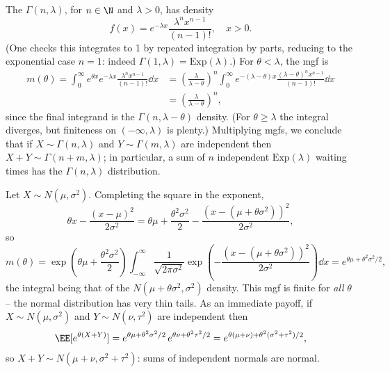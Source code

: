 \begin{example}
	The  $\Gamma(n, \lambda)$, for $n \in \N$ and $\lambda > 0$, has density
	$$
	f(x) = e^{-\lambda x}\frac{\lambda^n x^{n - 1}}{(n-1)!}, \quad x > 0.
	$$
	(One checks this integrates to 1 by repeated integration by parts, reducing to the exponential case $n = 1$: indeed $\Gamma(1, \lambda) = \mathrm{Exp}(\lambda)$.) For $\theta < \lambda$, the mgf is
	\begin{align*}
		m(\theta) = \int_0^{\infty} e^{\theta x}e^{-\lambda x}\frac{\lambda^n x^{n-1}}{(n-1)!}\dd x &= \left(\frac{\lambda}{\lambda - \theta}\right)^n \int_0^{\infty} e^{-(\lambda - \theta)x}\frac{(\lambda - \theta)^n x^{n - 1}}{(n-1)!}\dd x \\
		&= \left(\frac{\lambda}{\lambda - \theta}\right)^n,
	\end{align*}
	since the final integrand is the $\Gamma(n, \lambda - \theta)$ density. (For $\theta \geq \lambda$ the integral diverges, but finiteness on $(-\infty, \lambda)$ is plenty.) Multiplying mgfs, we conclude that if $X \sim \Gamma(n, \lambda)$ and $Y \sim \Gamma(m, \lambda)$ are independent then $X + Y \sim \Gamma(n + m, \lambda)$; in particular, a sum of $n$ independent $\mathrm{Exp}(\lambda)$ waiting times has the $\Gamma(n, \lambda)$ distribution.
\end{example}

\begin{example}
	Let $X \sim N(\mu, \sigma^2)$. Completing the square in the exponent,
	$$
	\theta x - \frac{(x - \mu)^2}{2\sigma^2} = \theta\mu + \frac{\theta^2\sigma^2}{2} - \frac{\left(x - (\mu + \theta\sigma^2)\right)^2}{2\sigma^2},
	$$
	so
	$$
	m(\theta) = \exp\left(\theta\mu + \frac{\theta^2\sigma^2}{2}\right)\int_{-\infty}^{\infty} \frac{1}{\sqrt{2\pi\sigma^2}}\exp\left(-\frac{(x - (\mu + \theta\sigma^2))^2}{2\sigma^2}\right)\dd x = e^{\theta\mu + \theta^2\sigma^2/2},
	$$
	the integral being that of the $N(\mu + \theta\sigma^2, \sigma^2)$ density. This mgf is finite for \emph{all} $\theta$ -- the normal distribution has very thin tails. As an immediate payoff, if $X \sim N(\mu, \sigma^2)$ and $Y \sim N(\nu, \tau^2)$ are independent then
	$$
	\EE[e^{\theta(X + Y)}] = e^{\theta\mu + \theta^2\sigma^2/2}\, e^{\theta\nu + \theta^2\tau^2/2} = e^{\theta(\mu + \nu) + \theta^2(\sigma^2 + \tau^2)/2},
	$$
	so $X + Y \sim N(\mu + \nu, \sigma^2 + \tau^2)$: sums of independent normals are normal.
\end{example}

